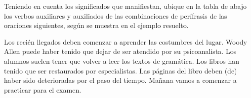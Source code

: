 \begin{ejercicio}\label{ej:11-tabla}
Teniendo en cuenta los significados que manifiestan, ubique en la tabla de abajo
los verbos auxiliares y auxiliados de las combinaciones de perífrasis de las
oraciones siguientes, según se muestra en el ejemplo resuelto.

\begin{exe}
  \ex Los recién llegados deben comenzar a aprender las costumbres del lugar.
  \ex Woody Allen puede haber tenido que dejar de ser atendido por su
      psicoanalista.
  \ex Los alumnos suelen tener que volver a leer los textos de gramática.
  \ex Los libros han tenido que ser restaurados por especialistas.
  \ex Las páginas del libro deben (de) haber sido deterioradas por el paso del
      tiempo.
  \ex Mañana vamos a comenzar a practicar para el examen.
\end{exe}

\begin{center}
\end{center}
\end{ejercicio}

